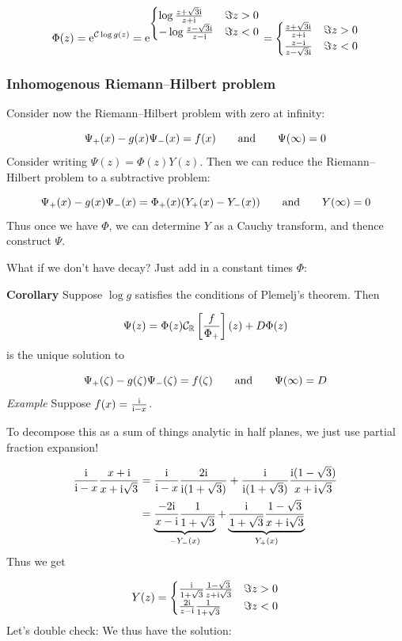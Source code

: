 \documentclass[12pt,a4paper]{article}
\def\qqand{\qquad\hbox{and}\qquad}
\def\I{ {\rm i} }
\def\E{ {\rm e} }
\def\R{ {\mathbb R} }
\def\CC{ {\cal C} }
\def\br[#1]{\left[{#1}\right]}
\def\endash{–}
\begin{document}
\[
\Phi(z) = \E^{\CC\log g(z)} = \E^{\begin{cases}
        \log{z+\sqrt 3 \I \over z+\I} & \Im z > 0 \\
            -\log{z- \sqrt 3\I \over z-\I} & \Im z < 0
           \end{cases}} = \begin{cases}
        {z+ \sqrt 3 \I \over z+\I} & \Im z > 0 \\
            {z-\I \over z-\sqrt 3\I} & \Im z < 0
           \end{cases}
\]
\subsubsection{Inhomogenous Riemann\ensuremath{\endash}Hilbert problem}
Consider now the  Riemann\ensuremath{\endash}Hilbert problem with zero at infinity:

\[
\Psi_+(x) - g(x)\Psi_-(x) = f(x) \qqand \Psi(\infty) =0
\]
Consider writing $\Psi(z) =  \Phi(z) Y(z)$. Then we can reduce the Riemann\ensuremath{\endash}Hilbert problem to a subtractive problem: 

\[
\Psi_+(x) - g(x)\Psi_-(x) = \Phi_+(x)(Y_+(x) - Y_-(x))\qqand Y(\infty) = 0
\]
Thus once we have $\Phi$, we can determine $Y$ as a Cauchy transform, and thence construct $\Psi$.

What if we don't have decay? Just add in a constant times $\Phi$:

\textbf{Corollary} Suppose $\log g$ satisfies the conditions of Plemelj's theorem. Then

\[
\Psi(z) = \Phi(z) \CC_\R\br[{f \over \Phi_+}](z) + D \Phi(z)
\]
is the unique solution to

\[
\Psi_+(\zeta) - g(\zeta)\Psi_-(\zeta) = f(\zeta) \qqand \Psi(\infty) =D
\]
\emph{Example} Suppose $f(x) = {\I \over \I-x}$. 

To decompose this as a sum of things analytic in half planes, we just use partial fraction expansion!


\begin{align*}
{\I \over \I-x} {x + \I \over x+ \I \sqrt{3}} &= {\I \over \I-x}{2\I \over \I(1+ \sqrt{3})}  +{\I \over \I(1+\sqrt 3)} {\I(1-\sqrt 3) \over x+ \I \sqrt{3}}\\
&= \underbrace{{-2 \I \over x-\I}{1 \over 1+ \sqrt{3}}}_{-Y_-(x)}  + \underbrace{{\I \over 1+\sqrt 3} {1-\sqrt 3 \over x+ \I \sqrt{3}}}_{Y_+(x)}
\end{align*}
Thus we get

\[
Y(z) = \begin{cases} 
{\I \over 1+\sqrt 3} {1-\sqrt 3 \over z+ \I \sqrt{3}} & \Im z > 0 \\
{2 \I \over z-\I}{1 \over 1+ \sqrt{3}} & \Im z < 0
\end{cases}
\]
Let's double check: We thus have the solution:
\end{document}
